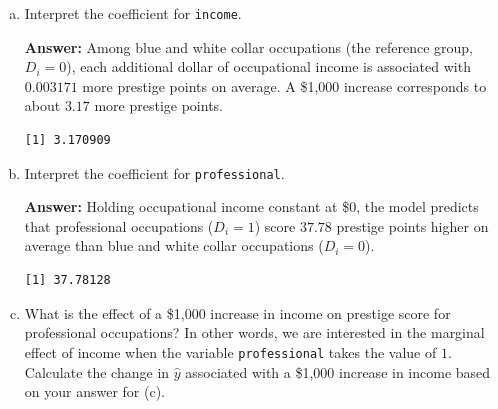 \documentclass[12pt,letterpaper]{article}
\newcommand{\rcode}[2]{}
\newcommand{\answer}{\par\vspace{.18cm}\noindent\textbf{Answer:} }
\renewcommand{\widehat}[1]{\mathord{\tikz[baseline=(outcome.base)]{
  \node[inner sep=0pt,outer sep=0pt] (outcome) {$#1$};
  \draw[line width=.48pt,line join=round]
    ([yshift=1.1pt]outcome.north west) -- ([yshift=4pt]outcome.north) --
    ([yshift=1.1pt]outcome.north east);}}}
\begin{document}
\begin{enumerate}[(a)]
$$\widehat{\texttt{prestige}}_i=\hat{\beta}_0+\hat{\beta}_1\,\texttt{income}_i+\hat{\beta}_2\,D_i+\hat{\beta}_3\,(\texttt{income}_i\times D_i)$$

$$
\begin{aligned}
\widehat{\texttt{prestige}}_i
&=21.142+0.003171\,\texttt{income}_i+37.781\,\texttt{professional}_i\\
&\quad-0.002326\,(\texttt{income}_i\times\texttt{professional}_i)
\end{aligned}
$$

It could also be written as:

$$\widehat{\texttt{prestige}}_i =
\begin{cases}
21.14226 + 0.00317091\,\texttt{income}_i & \text{if }D_i=\texttt{professional}_i=0,\\
58.92354 + 0.00084520\,\texttt{income}_i & \text{if }D_i=\texttt{professional}_i=1.
\end{cases}$$

\item Interpret the coefficient for \texttt{income}.

\answer Among blue and white collar occupations (the reference group, $D_i=0$), each additional dollar of occupational income is associated with $0.003171$ more prestige points on average. A \$1,000 increase corresponds to about $3.17$ more prestige points.

\rcode{40}{40}
\begin{verbatim}
[1] 3.170909
\end{verbatim}

\item Interpret the coefficient for \texttt{professional}.

\answer Holding occupational income constant at \$0, the model predicts that professional occupations ($D_i=1$) score $37.78$ prestige points higher on average than blue and white collar occupations ($D_i=0$).

\rcode{45}{45}
\begin{verbatim}
[1] 37.78128
\end{verbatim}

\newpage

\item What is the effect of a \$1,000 increase in income on prestige score for professional occupations? In other words, we are interested in the marginal effect of income when the variable \texttt{professional} takes the value of $1$. Calculate the change in $\hat{y}$ associated with a \$1,000 increase in income based on your answer for (c).


\end{enumerate}
\end{document}
